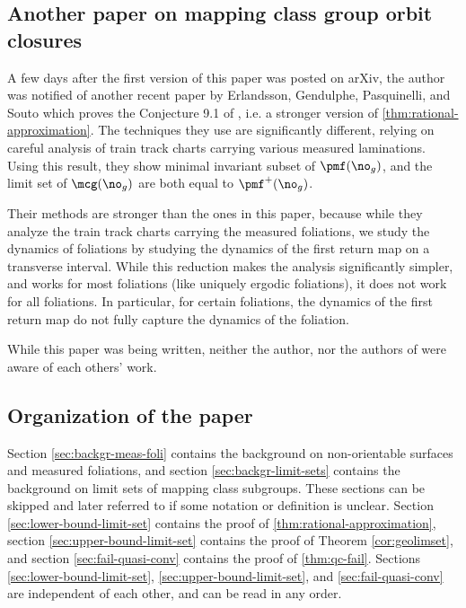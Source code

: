 \documentclass[12pt, reqno]{amsart}
\begin{document}
\subsection*{Another paper on mapping class group orbit closures}
A few days after the first version of this paper was posted on arXiv, the author was notified of another recent paper by Erlandsson, Gendulphe, Pasquinelli, and Souto \cite{erlandsson2021mapping} which proves the Conjecture 9.1 of \cite{gendulphe_whats_2017}, i.e. a stronger version of \autoref{thm:rational-approximation}.
The techniques they use are significantly different, relying on careful analysis of train track charts carrying various measured laminations.
Using this result, they show minimal invariant subset of $\pmf(\no_g)$, and the limit set of $\mcg(\no_g)$ are both equal to $\pmf^+(\no_g)$.

Their methods are stronger than the ones in this paper, because while they analyze the train track charts carrying the measured foliations, we study the dynamics of foliations by studying the dynamics of the first return map on a transverse interval.
While this reduction makes the analysis significantly simpler, and works for most foliations (like uniquely ergodic foliations), it does not work for all foliations.
In particular, for certain foliations, the dynamics of the first return map do not fully capture the dynamics of the foliation.

While this paper was being written, neither the author, nor the authors of \cite{erlandsson2021mapping} were aware of each others' work.

\subsection*{Organization of the paper}
Section \ref{sec:backgr-meas-foli} contains the background on non-orientable surfaces and measured foliations, and section \ref{sec:backgr-limit-sets} contains the background on limit sets of mapping class subgroups.
These sections can be skipped and later referred to if some notation or definition is unclear.
Section \ref{sec:lower-bound-limit-set} contains the proof of \autoref{thm:rational-approximation}, section \ref{sec:upper-bound-limit-set} contains the proof of Theorem \ref{cor:geolimset}, and section \ref{sec:fail-quasi-conv} contains the proof of \autoref{thm:qc-fail}.
Sections \ref{sec:lower-bound-limit-set}, \ref{sec:upper-bound-limit-set}, and \ref{sec:fail-quasi-conv} are independent of each other, and can be read in any order.
\end{document}
